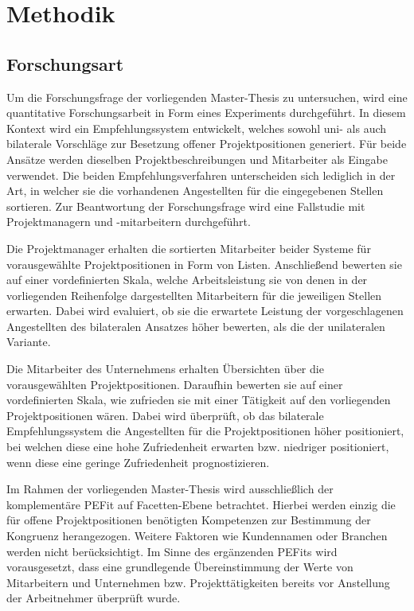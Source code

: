 \chapter{Methodik}
\label{ch:methodik}

\section{Forschungsart}
\label{ch:methodik:art}
Um die Forschungsfrage der vorliegenden Master-Thesis zu untersuchen, wird eine quantitative Forschungsarbeit in Form eines Experiments durchgeführt. In diesem Kontext wird ein Empfehlungssystem entwickelt, welches sowohl uni- als auch bilaterale Vorschläge zur Besetzung offener Projektpositionen generiert. Für beide Ansätze werden dieselben Projektbeschreibungen und Mitarbeiter als Eingabe verwendet. Die beiden Empfehlungsverfahren unterscheiden sich lediglich in der Art, in welcher sie die vorhandenen Angestellten für die eingegebenen Stellen sortieren. Zur Beantwortung der Forschungsfrage wird eine Fallstudie mit Projektmanagern und -mitarbeitern durchgeführt.

Die Projektmanager erhalten die sortierten Mitarbeiter beider Systeme für vorausgewählte Projektpositionen in Form von Listen. Anschließend bewerten sie auf einer vordefinierten Skala, welche Arbeitsleistung sie von denen in der vorliegenden Reihenfolge dargestellten Mitarbeitern für die jeweiligen Stellen erwarten. Dabei wird evaluiert, ob sie die erwartete Leistung der vorgeschlagenen Angestellten des bilateralen Ansatzes höher bewerten, als die der unilateralen Variante.

Die Mitarbeiter des Unternehmens erhalten Übersichten über die vorausgewählten Projektpositionen. Daraufhin bewerten sie auf einer vordefinierten Skala, wie zufrieden sie mit einer Tätigkeit auf den vorliegenden Projektpositionen wären. Dabei wird überprüft, ob das bilaterale Empfehlungssystem die Angestellten für die Projektpositionen höher positioniert, bei welchen diese eine hohe Zufriedenheit erwarten bzw. niedriger positioniert, wenn diese eine geringe Zufriedenheit prognostizieren.

Im Rahmen der vorliegenden Master-Thesis wird ausschließlich der komplementäre \ac{PEFit} auf Facetten-Ebene betrachtet. Hierbei werden einzig die für offene Projektpositionen benötigten Kompetenzen zur Bestimmung der Kongruenz herangezogen. Weitere Faktoren wie Kundennamen oder Branchen werden nicht berücksichtigt. Im Sinne des ergänzenden \acp{PEFit} wird vorausgesetzt, dass eine grundlegende Übereinstimmung der Werte von Mitarbeitern und Unternehmen bzw. Projekttätigkeiten bereits vor Anstellung der Arbeitnehmer überprüft wurde.

